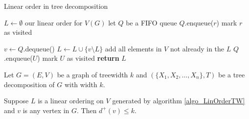 %    
%    
%    
%    
%    
%
%    

\begin{algorithm}[h]
    \caption{Linear order in tree decomposition}
    \label{algo_LinOrderTW}
    \begin{algorithmic}[1]
        
            \State $L \gets \emptyset$ \Comment our linear order for $V(G)$
            \State let $Q$ be a FIFO queue 
            \State $Q$.enqueue($r$)
            \State mark $r$ as visited
            
                \State $v \gets Q$.dequeue()
                \State $L \gets L \cup \{v\setminus L\}$ \Comment add all elements in $V$ not already in the $L$
                    \State $Q$.enqueue($U$)
                    \State mark $U$ as visited
                \EndFor        
            \EndWhile 
            \State \textbf{return}  $L$
        \EndFunction
    \end{algorithmic}
\end{algorithm}

\begin{lemma} \label{Lemma_TWLinOrdBound}
    Let $G=(E,V)$ be a graph of treewidth $k$ and $(\{X_1,X_2,\dots,X_n\},T)$ be a tree decomposition of $G$ with width $k$.
    
    Suppose $L$ is a linear ordering on $V$ generated by algorithm \ref{algo_LinOrderTW} and $v$ is any vertex in $G$. Then $d^+(v) \leq k$. 
\end{lemma}

